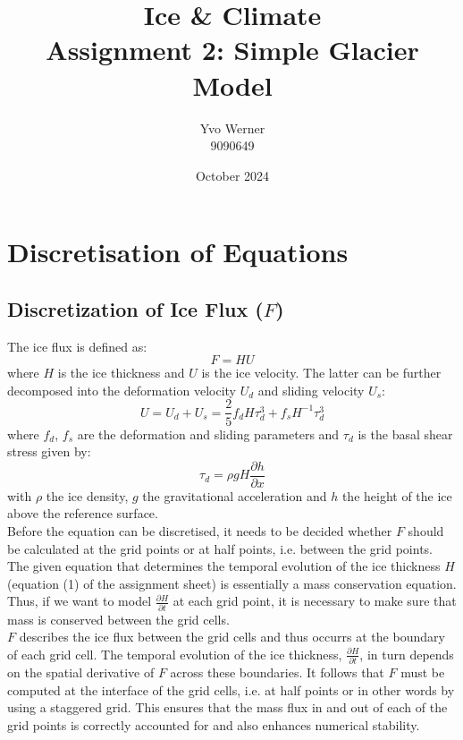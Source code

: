 \documentclass{article}
\title{Ice \& Climate \\ \vspace{1em} \large Assignment 2: Simple Glacier Model \normalsize}
\author{Yvo Werner\\ 9090649 }
\date{October 2024}
\begin{document}
\maketitle

\section{Discretisation of Equations}

\subsection*{Discretization of Ice Flux (\( F \))}

The ice flux is defined as:
\begin{equation*}
    F = H U
\end{equation*}
where \( H \) is the ice thickness and \( U \) is the ice velocity.
The latter can be further decomposed into the deformation velocity $U_d$ and sliding velocity $U_s$:
\begin{equation*}
    U = U_d + U_s = \frac{2}{5} f_d H \tau_d^3 + f_s H^{-1} \tau_d^3
\end{equation*}
where $f_d$, $f_s$ are the deformation and sliding parameters and $\tau_d$ is the basal shear stress given by:
\begin{equation*}
    \tau_d = \rho g H \frac{\partial h}{\partial x}
\end{equation*}
with $\rho$ the ice density, $g$ the gravitational acceleration and $h$ the height of the ice above the reference surface.\\
Before the equation can be discretised, it needs to be decided whether $F$ should be calculated at the grid points or at half points, i.e. between the grid points. 
The given equation that determines the temporal evolution of the ice thickness $H$ (equation (1) of the assignment sheet) is essentially a mass conservation equation. 
Thus, if we want to model $\frac{\partial H }{\partial t}$ at each grid point, it is necessary to make sure that mass is conserved between the grid cells.  \\
$F$ describes the ice flux between the grid cells and thus occurrs at the boundary of each grid cell.
The temporal evolution of the ice thickness, $\frac{\partial H }{\partial t}$, in turn depends on the spatial derivative of $F$ across these boundaries.
It follows that $F$ must be computed at the interface of the grid cells, i.e. at half points or in other words by using a staggered grid.
This ensures that the mass flux in and out of each of the grid points is correctly accounted for and also enhances numerical stability.\\
\end{document}
